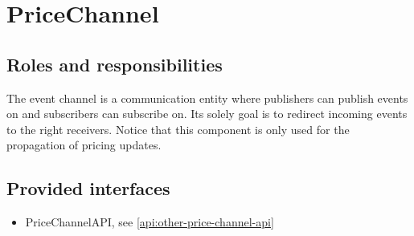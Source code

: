 \section{PriceChannel}
\label{element:price-channel}

\subsection{Roles and responsibilities}

\npar The event channel is a communication entity where publishers can publish
events on and subscribers can subscribe on. Its solely goal is to redirect
incoming events to the right receivers. Notice that this component is only used
for the propagation of pricing updates.

\subsection{Provided interfaces}

\begin{itemize}
  \item PriceChannelAPI, see \ref{api:other-price-channel-api}
\end{itemize}